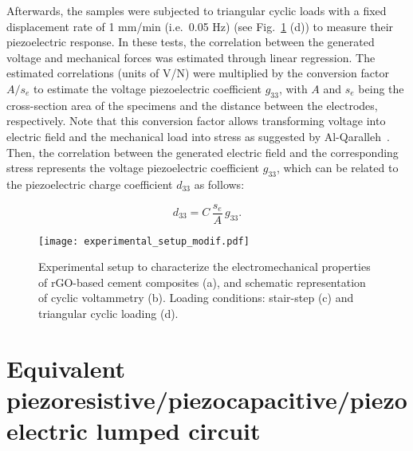\documentclass[a4paper,fleqn]{cas-sc}
\begin{document}
Afterwards, the samples were subjected to triangular cyclic loads with a fixed displacement rate of 1 mm/min (i.e.~0.05 Hz) (see Fig.~\ref{experimental_setup} (d)) to measure their piezoelectric response. In these tests, the correlation between the generated voltage and mechanical forces was estimated through linear regression. The estimated correlations (units of V/N) were multiplied by the conversion factor $A/s_e$ to estimate the voltage piezoelectric coefficient $g_{33}$, with $A$ and $s_e$ being the cross-section area of the specimens and the distance between the electrodes, respectively. Note that this conversion factor allows transforming voltage into electric field and the mechanical load into stress as suggested by Al-Qaralleh~\cite{AlQaralleh2022}. Then, the correlation between the generated electric field and the corresponding stress represents the voltage piezoelectric coefficient $g_{33}$, which can be related to the piezoelectric charge coefficient $d_{33}$ as follows:

\begin{equation}\label{eq:d33}
    d_{33} = C \, \frac{s_e}{A} \, g_{33}.
\end{equation}

\begin{figure}[ht]
\centering
\texttt{[image: experimental\_setup\_modif.pdf]}
\caption{Experimental setup to characterize the electromechanical properties of rGO-based cement composites (a), and schematic representation of cyclic voltammetry (b). Loading conditions: stair-step (c) and triangular cyclic loading (d).}
\label{experimental_setup}
\end{figure}



\section{Equivalent piezoresistive/piezocapacitive/piezoelectric lumped circuit}\label{Sect1}
\end{document}
